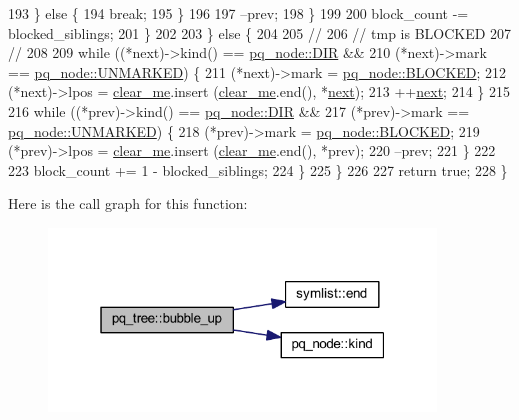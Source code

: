 \begin{DoxyCode}
193             \} \textcolor{keywordflow}{else} \{
194             \textcolor{keywordflow}{break};
195             \}
196 
197             --prev;
198         \}
199         
200         block\_count -= blocked\_siblings;
201         \}
202         
203     \} \textcolor{keywordflow}{else} \{
204         
205         \textcolor{comment}{//}
206         \textcolor{comment}{// tmp is BLOCKED}
207         \textcolor{comment}{//}
208 
209         \textcolor{keywordflow}{while} ((*next)->kind() == \mbox{\hyperlink{classpq__node_a96827bdca8bf81d20213405dd27f8fa6a5afa3e7100ee720a1569cfff090a210d}{pq\_node::DIR}} && 
210            (*next)->mark == \mbox{\hyperlink{classpq__node_a6236b20cd5f6cc02cb5f637ed34c96d9a7fbe5f6a363f9f2b5a154c61b2389d59}{pq\_node::UNMARKED}}) \{
211         (*next)->mark = \mbox{\hyperlink{classpq__node_a6236b20cd5f6cc02cb5f637ed34c96d9a70312622ded9f04f068838ec195fc53c}{pq\_node::BLOCKED}};
212         (*next)->lpos = \mbox{\hyperlink{classpq__tree_a43bcdb58d91b7e20860f523f49c74fd1}{clear\_me}}.insert (\mbox{\hyperlink{classpq__tree_a43bcdb58d91b7e20860f523f49c74fd1}{clear\_me}}.end(), *\mbox{\hyperlink{struct_g_m_l__pair_aef47e6103f05e1411fa55f731972b592}{next}});
213         ++\mbox{\hyperlink{struct_g_m_l__pair_aef47e6103f05e1411fa55f731972b592}{next}};
214         \}
215 
216         \textcolor{keywordflow}{while} ((*prev)->kind() == \mbox{\hyperlink{classpq__node_a96827bdca8bf81d20213405dd27f8fa6a5afa3e7100ee720a1569cfff090a210d}{pq\_node::DIR}} && 
217            (*prev)->mark == \mbox{\hyperlink{classpq__node_a6236b20cd5f6cc02cb5f637ed34c96d9a7fbe5f6a363f9f2b5a154c61b2389d59}{pq\_node::UNMARKED}}) \{
218         (*prev)->mark = \mbox{\hyperlink{classpq__node_a6236b20cd5f6cc02cb5f637ed34c96d9a70312622ded9f04f068838ec195fc53c}{pq\_node::BLOCKED}};
219         (*prev)->lpos = \mbox{\hyperlink{classpq__tree_a43bcdb58d91b7e20860f523f49c74fd1}{clear\_me}}.insert (\mbox{\hyperlink{classpq__tree_a43bcdb58d91b7e20860f523f49c74fd1}{clear\_me}}.end(), *prev);
220         --prev;
221         \}
222 
223         block\_count += 1 - blocked\_siblings;
224     \}
225     \}
226     
227     \textcolor{keywordflow}{return} \textcolor{keyword}{true};
228 \}
\end{DoxyCode}
Here is the call graph for this function\+:\nopagebreak
\begin{figure}[H]
\begin{center}
\leavevmode
\includegraphics[width=292pt]{classpq__tree_a109cb910dcb75d3e196a46f5174406c7_cgraph}
\end{center}
\end{figure}

